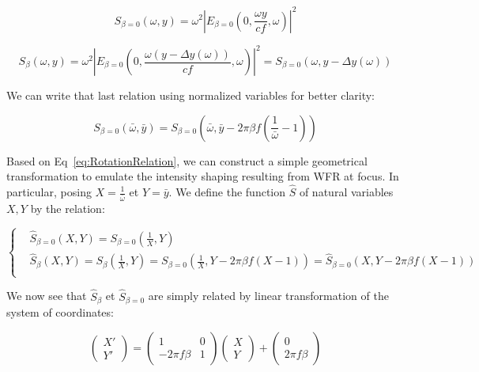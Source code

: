 \begin{equation}
S_{\beta = 0}(\omega,y) =  \omega^2 |E_{\beta=0}(0,\frac{\omega y}{c f},\omega)|^2
\end{equation}

\begin{equation}
S_{\beta}(\omega,y) =  \omega^2|E_{\beta = 0}(0,\frac{\omega (y- \Delta y(\omega))}{c f},\omega)|^2 = S_{\beta=0}(\omega,y-\Delta y (\omega))
\end{equation}

\noindent We can write that last relation using normalized variables for better clarity: 


\begin{equation}
\label{eq:RotationRelation}
S_{\beta = 0}(\bar{\omega},\bar{y}) =  S_{\beta=0}\left(\bar{\omega},\bar{y}-2\pi  \beta  f (\frac{1}{\bar{\omega}}-1)\right)
\end{equation}



\noindent Based on Eq~\ref{eq:RotationRelation}, we can construct a simple geometrical transformation to emulate the intensity shaping resulting from WFR at focus. In particular, posing $X = \frac{1}{\bar{\omega}}$ et $Y = \bar{y}$. We define the function $\hat{S}$ of natural variables $X,Y$ by the relation:

\begin{equation}
  \left\{
      \begin{aligned}
        &\hat{S}_{\beta=0}(X,Y) = S_{\beta = 0}(\frac{1}{X},Y) \\
        &\hat{S}_{\beta}(X,Y) = S_{\beta}(\frac{1}{X},Y) = S_{\beta=0}(\frac{1}{X},Y-2\pi\beta f (X-1)) = \hat{S}_{\beta=0}(X,Y-2\pi\beta f(X-1))  \\
      \end{aligned}
    \right.
\end{equation}


\noindent We now see that  $\hat{S}_{\beta}$ et $\hat{S}_{\beta=0}$ are simply related by linear transformation of the system of coordinates:

$$
\left( \begin{array}{c}
X'\\
Y'\end{array} \right)=
\left( \begin{array}{cc}
1&0\\
-2\pi f\beta &1\end{array} \right)\left( \begin{array}{c}
X \\
Y \end{array} \right)+\left( \begin{array}{c}
0\\
2\pi f\beta \end{array} \right)
$$

